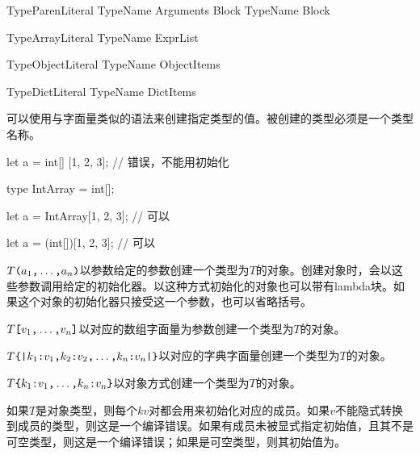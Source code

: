 \begin{bnf}{TypeParenLiteral}
    TypeName \terminal{(} Arguments\bnfq \terminal{)} Block\bnfs \br
    TypeName Block
\end{bnf}

\begin{bnf}{TypeArrayLiteral}
    TypeName \terminal{[} ExprList\bnfq \terminal{]}
\end{bnf}

\begin{bnf}{TypeObjectLiteral}
    TypeName \terminal{\{} ObjectItems\bnfq \terminal{\}}
\end{bnf}

\begin{bnf}{TypeDictLiteral}
    TypeName \terminal{\{|} DictItems\bnfq \terminal{|\}}
\end{bnf}

\pnum
可以使用与字面量类似的语法来创建指定类型的值。被创建的类型必须是一个类型名称。

\enterexample
\begin{codeblock}

let a = int[] [1, 2, 3]; // 错误，不能用\tcode{[]}初始化

type IntArray = int[];

let a = IntArray[1, 2, 3]; // 可以

let a = (int[])[1, 2, 3]; // 可以

\end{codeblock}
\exitexample

\pnum
$T\texttt{(}a_1\texttt{,}\ldots\texttt{,}a_n\texttt{)}$以参数给定的参数创建一个类型为$T$的对象。创建对象时，会以这些参数调用给定的初始化器。以这种方式初始化的对象也可以带有lambda块。如果这个对象的初始化器只接受这一个参数，也可以省略括号。

\pnum
$T\texttt{[}v_1\texttt{,}\ldots\texttt{,}v_n\texttt{]}$以对应的数组字面量为参数创建一个类型为$T$的对象。

\pnum
$T\texttt{\{|}k_1\texttt{:} v_1\texttt{,} k_2\texttt{:} v_2\texttt{,} \ldots\texttt{,} k_n\texttt{:} v_n\texttt{|\}}$以对应的字典字面量创建一个类型为$T$的对象。

\pnum
$T\texttt{\{}k_1\texttt{:}v_1\texttt{,}\ldots\texttt{,}k_n\texttt{:}v_n\texttt{\}}$以对象方式创建一个类型为$T$的对象。

\pnum
如果$T$是对象类型，则每个$kv$对都会用来初始化对应的成员。如果$v$不能隐式转换到成员的类型，则这是一个编译错误。如果有成员未被显式指定初始值，且其不是可空类型，则这是一个编译错误；如果是可空类型，则其初始值为。

